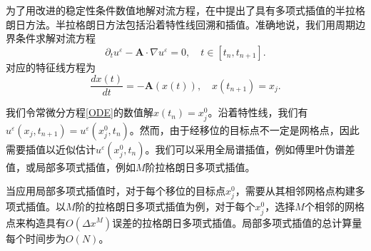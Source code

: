 为了用改进的稳定性条件数值地解对流方程，在中提出了具有多项式插值的半拉格朗日方法。半拉格朗日方法包括沿着特性线回溯和插值。准确地说，我们用周期边界条件求解对流方程
\begin{equation}\label{conv-1d}
    \partial_t u^\varepsilon-\mathbf{A}\cdot \nabla u^\varepsilon=0,\quad t\in[t_n,t_{n+1}].
\end{equation}
对应的特征线方程为
\begin{equation}\label{ODE}
    \frac{dx(t)}{dt}=-\mathbf{A}(x(t)),\quad x(t_{n+1})=x_j.
\end{equation}

我们令常微分方程\eqref{ODE}的数值解$x(t_n) = x_j^0$。沿着特性线，我们有$u^{\varepsilon}(x_{j},t_{n+1})=  u^{\varepsilon}(x^0_j,t_{n})$。然而，由于经移位的目标点不一定是网格点，因此需要插值以近似估计$u^{\varepsilon}(x_j^0,t_{n})$。我们可以采用全局谱插值，例如傅里叶伪谱差值，或局部多项式插值，例如$M$阶拉格朗日多项式插值。

当应用局部多项式插值时，对于每个移位的目标点$x_j^0$，需要从其相邻网格点构建多项式插值。以$M$阶的拉格朗日多项式插值为例，对于每个$x_j^0$，选择$M$个相邻的网格点来构造具有$O(\Delta x^M)$误差的拉格朗日多项式插值。局部多项式插值的总计算量每个时间步为$O(N)$。

